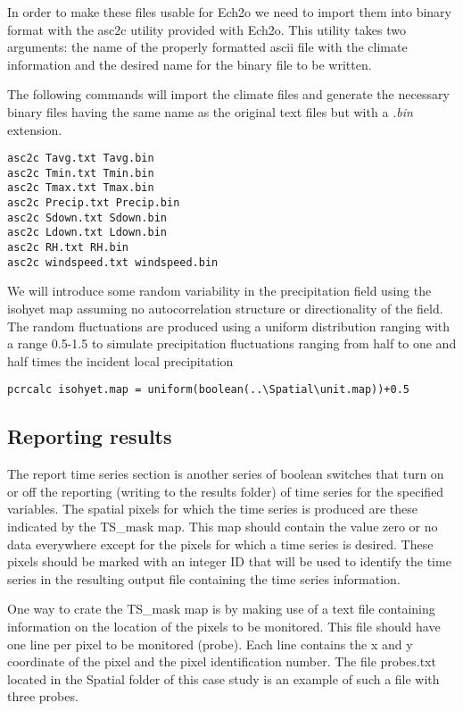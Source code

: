 In order to make these files usable for Ech2o we need to import them into binary format with the \textsf{asc2c} utility provided with Ech2o. This utility takes two arguments: the name of the properly formatted ascii file with the climate information and the desired name for the binary file to be written.

The following commands will import the climate files and generate the necessary binary files having the same name as the original text files but with a \textit{.bin} extension.

\begin{verbatim}
asc2c Tavg.txt Tavg.bin
asc2c Tmin.txt Tmin.bin
asc2c Tmax.txt Tmax.bin
asc2c Precip.txt Precip.bin
asc2c Sdown.txt Sdown.bin
asc2c Ldown.txt Ldown.bin
asc2c RH.txt RH.bin
asc2c windspeed.txt windspeed.bin
\end{verbatim} 

We will introduce some random variability in the precipitation field using the isohyet map assuming no autocorrelation structure or directionality of the field. The random fluctuations are produced using a uniform distribution ranging with a range 0.5-1.5 to simulate precipitation fluctuations ranging from half to one and half times the incident local precipitation 

\begin{verbatim}
pcrcalc isohyet.map = uniform(boolean(..\Spatial\unit.map))+0.5
\end{verbatim} 


\subsection{Reporting results}
 
The report time series section is another series of boolean switches that turn on or off the reporting (writing to the results folder) of time series for the specified variables. The spatial pixels for which the time series is produced are these indicated by the \textsf{TS\_mask} map. This map should contain the value zero or no data everywhere except for the pixels for which a time series is desired. These pixels should be marked with an integer ID that will be used to identify the time series in the resulting output file containing the time series information.   

One way to crate the \textsf{TS\_mask} map is by making use of a text file containing information on the location of the pixels to be monitored. This file should have one line per pixel to be monitored (probe). Each line contains the x and y coordinate of the pixel and the pixel identification number. The file \textsf{probes.txt} located in the \textsf{Spatial} folder of this case study is an example of such a file with three probes. 

